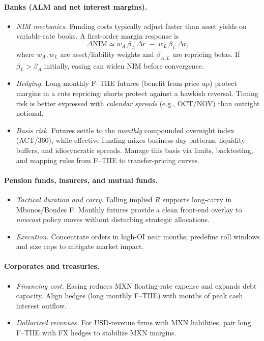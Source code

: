 \documentclass[11pt,a4paper]{article} %
\begin{document}
\paragraph{Banks (ALM and net interest margins).}
\begin{itemize}
  \item \textit{NIM mechanics.} Funding costs typically adjust faster than asset yields on variable-rate books. A first-order margin response is
  \[
  \Delta \mathrm{NIM} \simeq w_A\,\beta_A\,\Delta r \;-\; w_L\,\beta_L\,\Delta r,
  \]
  where $w_A,w_L$ are asset/liability weights and $\beta_{A,L}$ are repricing betas. If $\beta_L>\beta_A$ initially, easing can widen NIM before convergence.
  \item \textit{Hedging.} Long monthly F--TIIE futures (benefit from price up) protect margins in a cuts repricing; shorts protect against a hawkish reversal. Timing risk is better expressed with \emph{calendar spreads} (e.g., OCT/NOV) than outright notional.
  \item \textit{Basis risk.} Futures settle to the \emph{monthly} compounded overnight index (ACT/360), while effective funding mixes business-day patterns, liquidity buffers, and idiosyncratic spreads. Manage this basis via limits, backtesting, and mapping rules from F--TIIE to transfer-pricing curves.
\end{itemize}

\paragraph{Pension funds, insurers, and mutual funds.}
\begin{itemize}
  \item \textit{Tactical duration and carry.} Falling implied $R$ supports long-carry in Mbonos/Bondes F. Monthly futures provide a clean front-end overlay to \emph{nowcast} policy moves without disturbing strategic allocations.
  \item \textit{Execution.} Concentrate orders in high-OI near months; predefine roll windows and size caps to mitigate market impact.
\end{itemize}

\paragraph{Corporates and treasuries.}
\begin{itemize}
  \item \textit{Financing cost.} Easing reduces MXN floating-rate expense and expands debt capacity. Align hedges (long monthly F--TIIE) with months of peak cash interest outflow.
  \item \textit{Dollarized revenues.} For USD-revenue firms with MXN liabilities, pair long F--TIIE with FX hedges to stabilize MXN margins.
\end{itemize}
\end{document}
